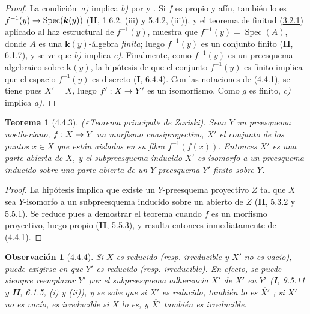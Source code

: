 \documentclass[10pt,oneside,openany]{book}
\theoremstyle{egaenv}\newtheorem*{env}{---}
\theoremstyle{egastatement}
\newtheorem*{theorem}{Teorema}
\theoremstyle{egadescription}
\newtheorem*{remark}{Observación}
\renewcommand{\to}{\mathchoice{\longrightarrow}{\rightarrow}{\rightarrow}{\rightarrow}}
\begin{document}
\begin{proof}
La condición~\emph{a)} implica \emph{b)} por  y
. Si $f$ es propio y afín, también lo es
$f^{-1}(y)\to\operatorname{Spec}(\boldsymbol{k}(y))$ (\textbf{II}, 1.6.2, (iii) y 5.4.2, (iii)), y el teorema de finitud (\hyperref[III.3.2.1-fr]{3.2.1}) aplicado al haz estructural de $f^{-1}(y)$, muestra
que $f^{-1}(y)=\operatorname{Spec}(A)$, donde
$A$ es una $\boldsymbol{k}(y)$-álgebra \emph{finita}; luego $f^{-1}(y)$ es un conjunto finito (\textbf{II}, 6.1.7), y se ve que \emph{b)} implica \emph{c)}. Finalmente, como $f^{-1}(y)$ es un preesquema
algebraico sobre $\boldsymbol{k}(y)$, la hipótesis de que el conjunto $f^{-1}(y)$ es
finito implica que el espacio $f^{-1}(y)$ es discreto (\textbf{I}, 6.4.4). Con las
notaciones de (\hyperref[III.4.4.1-fr]{4.4.1}), se tiene pues $X'=X$, luego
$f':X\to Y'$ es un isomorfismo. Como $g$ es finito, \emph{c)} implica \emph{a)}.
\end{proof}

\begin{theorem}[4.4.3]
\label{III.4.4.3-fr}
\textnormal{(«Teorema principal» de Zariski).}
Sean $Y$ un preesquema noetheriano, $f:X\to Y$ un morfismo cuasiproyectivo,
$X'$ el conjunto de los puntos $x\in X$ que están aislados en su fibra
$f^{-1}(f(x))$. Entonces $X'$ es una parte abierta de $X$, y el
subpreesquema inducido $X'$ es isomorfo a un preesquema inducido sobre una parte
abierta de un $Y$-preesquema $Y'$ finito sobre $Y$.
\end{theorem}

\begin{proof}
La hipótesis implica que existe un $Y$-preesquema proyectivo $Z$ tal que $X$
sea $Y$-isomorfo a un subpreesquema inducido sobre un abierto de $Z$
(\textbf{II}, 5.3.2 y 5.5.1). Se reduce pues a demostrar el teorema cuando $f$
es un morfismo proyectivo, luego propio (\textbf{II}, 5.5.3), y resulta entonces
inmediatamente de (\hyperref[III.4.4.1-fr]{4.4.1}).
\end{proof}

\begin{remark}[4.4.4]
\label{III.4.4.4-fr}
Si $X$ es reducido (resp. irreducible y $X'$ no
es vacío), puede exigirse en  que $Y'$ es reducido (resp. irreducible). En efecto, se puede siempre reemplazar $Y'$ por el subpreesquema \emph{adherencia} $\overline{X'}$ de $X'$ en $Y'$ (\textbf{I}, 9.5.11 y \textbf{II}, 6.1.5, (i) y (ii)), y se sabe que si $X'$ es reducido, también
lo es $\overline{X'}$ ; si $X'$ no es vacío, es
irreducible si $X$ lo es, y $\overline{X'}$ también es irreducible.
\end{remark}
\end{document}

